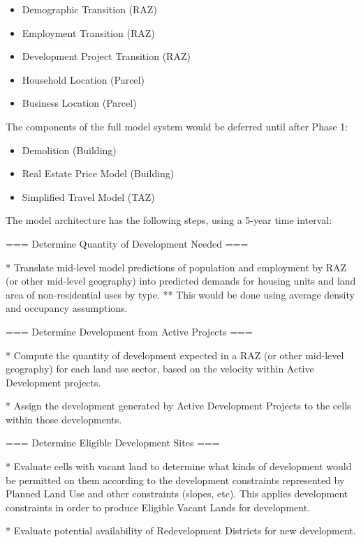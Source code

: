 \begin{itemize}
\item Demographic Transition (RAZ)
\item Employment Transition (RAZ)
\item Development Project Transition (RAZ)
\item Household Location (Parcel)
\item Business Location (Parcel)
\end{itemize}

The components of the full model system would be deferred until after Phase 1:

\begin{itemize}
\item Demolition (Building)
\item Real Estate Price Model (Building)
\item Simplified Travel Model (TAZ)
\end{itemize}





The model architecture has the following steps, using a 5-year time interval:

=== Determine Quantity of Development Needed ===

* Translate mid-level model predictions of population and employment by RAZ (or other mid-level geography) into predicted demands for housing units and land area of non-residential uses by type.
** This would be done using average density and occupancy assumptions.

=== Determine Development from Active Projects ===

* Compute the quantity of development expected in a RAZ (or other mid-level geography) for each land use sector, based on the velocity within Active Development projects.

* Assign the development generated by Active Development Projects to the cells within those developments.

=== Determine Eligible Development Sites ===

* Evaluate cells with vacant land to determine what kinds of development would be permitted on them according to the development constraints represented by Planned Land Use and other constraints (slopes, etc).  This applies development constraints in order to produce Eligible Vacant Lands for development.

* Evaluate potential availability of Redevelopment Districts for new development.

